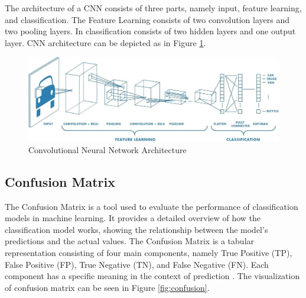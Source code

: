 The architecture of a CNN consists of three parts, namely input, feature learning, and classification. The Feature Learning consists of two convolution layers and two pooling layers. In classification consists of two hidden layers and one output layer. CNN architecture can be depicted as in Figure \ref{fig:arsitektur cnn}.

\begin{figure} [ht] \centering
    \includegraphics[scale=0.2]{gambar/cnn.jpg}
    \caption{Convolutional Neural Network Architecture}
    \label{fig:arsitektur cnn}
\end{figure}

\subsection{Confusion Matrix}

The Confusion Matrix is a tool used to evaluate the performance of classification models in machine learning. It provides a detailed overview of how the classification model works, showing the relationship between the model's predictions and the actual values. The Confusion Matrix is a tabular representation consisting of four main components, namely True Positive (TP), False Positive (FP), True Negative (TN), and False Negative (FN). Each component has a specific meaning in the context of prediction \cite{provost2013data}. The visualization of confusion matrix can be seen in Figure \ref{fig:confusion}.

